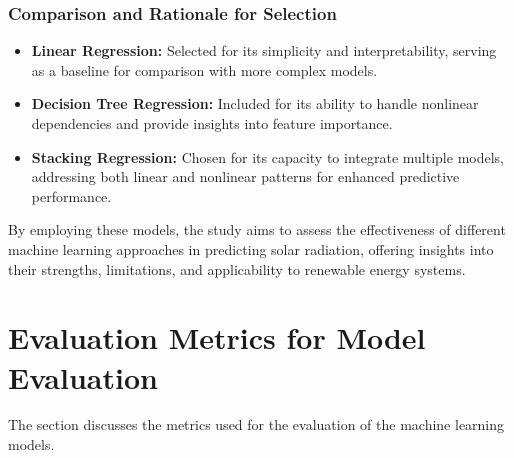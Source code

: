 \documentclass[10pt,twocolumn]{article}
\begin{document}
\subsubsection{Comparison and Rationale for Selection}
\begin{itemize}
    \item \textbf{Linear Regression:} Selected for its simplicity and interpretability, serving as a baseline for comparison with more complex models.
    \item \textbf{Decision Tree Regression:} Included for its ability to handle nonlinear dependencies and provide insights into feature importance.
    \item \textbf{Stacking Regression:} Chosen for its capacity to integrate multiple models, addressing both linear and nonlinear patterns for enhanced predictive performance.
\end{itemize}

By employing these models, the study aims to assess the effectiveness of different machine learning approaches in predicting solar radiation, offering insights into their strengths, limitations, and applicability to renewable energy systems.
\section{Evaluation Metrics for Model Evaluation}
The section discusses the metrics used for the evaluation of the machine learning models.
\end{document}
